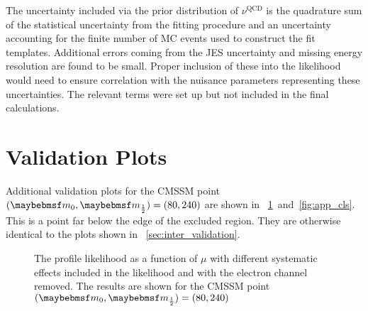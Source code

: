 The uncertainty included via the prior distribution of $\nu^{\textrm{QCD}}$ is
the quadrature sum of the statistical uncertainty from the fitting procedure and an
uncertainty accounting for the finite number of \ac{MC} events used to construct
the fit templates. Additional errors coming from the \ac{JES} uncertainty and
missing energy resolution are found to be small. Proper inclusion of these into
the likelihood would need to ensure correlation with the nuisance parameters
representing these uncertainties. The relevant terms were set up but not
included in the final calculations.

\section{Validation Plots}
\label{sec:app_inter_validation}
Additional validation plots for the \ac{CMSSM} point $(\Mzero, \Mhalf) = (80,
240)$ are shown in \figs~\ref{fig:app_pl}~and~\ref{fig:app_cls}. This is a
point far below the edge of the excluded region. They are otherwise identical to
the plots shown in \sec~\ref{sec:inter_validation}.


\begin{figure}[h!]
\centering
{}\quad
{}
\caption[The profile likelihood as a function of $\mu$]{The profile likelihood
  as a function of $\mu$  with different
  systematic effects included in the likelihood and
   with the electron channel removed. The
  results are shown for the \ac{CMSSM} point $(\Mzero, \Mhalf) = (80, 240)$}
\label{fig:app_pl}
\end{figure}


